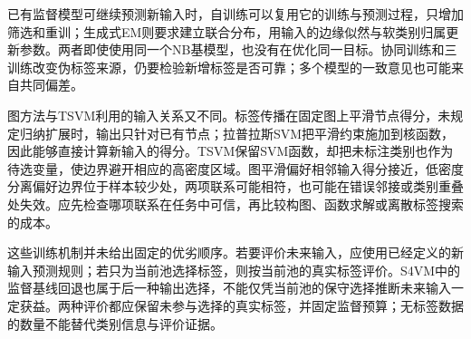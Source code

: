 已有监督模型可继续预测新输入时，自训练可以复用它的训练与预测过程，只增加筛选和重训；生成式EM则要求建立联合分布，用输入的边缘似然与软类别归属更新参数。两者即使使用同一个NB基模型，也没有在优化同一目标。协同训练和三训练改变伪标签来源，仍要检验新增标签是否可靠；多个模型的一致意见也可能来自共同偏差。

图方法与TSVM利用的输入关系又不同。标签传播在固定图上平滑节点得分，未规定归纳扩展时，输出只针对已有节点；拉普拉斯SVM把平滑约束施加到核函数，因此能够直接计算新输入的得分。TSVM保留SVM函数，却把未标注类别也作为待选变量，使边界避开相应的高密度区域。图平滑偏好相邻输入得分接近，低密度分离偏好边界位于样本较少处，两项联系可能相符，也可能在错误邻接或类别重叠处失效。应先检查哪项联系在任务中可信，再比较构图、函数求解或离散标签搜索的成本。

这些训练机制并未给出固定的优劣顺序。若要评价未来输入，应使用已经定义的新输入预测规则；若只为当前池选择标签，则按当前池的真实标签评价。S4VM中的监督基线回退也属于后一种输出选择，不能仅凭当前池的保守选择推断未来输入一定获益。两种评价都应保留未参与选择的真实标签，并固定监督预算；无标签数据的数量不能替代类别信息与评价证据。
